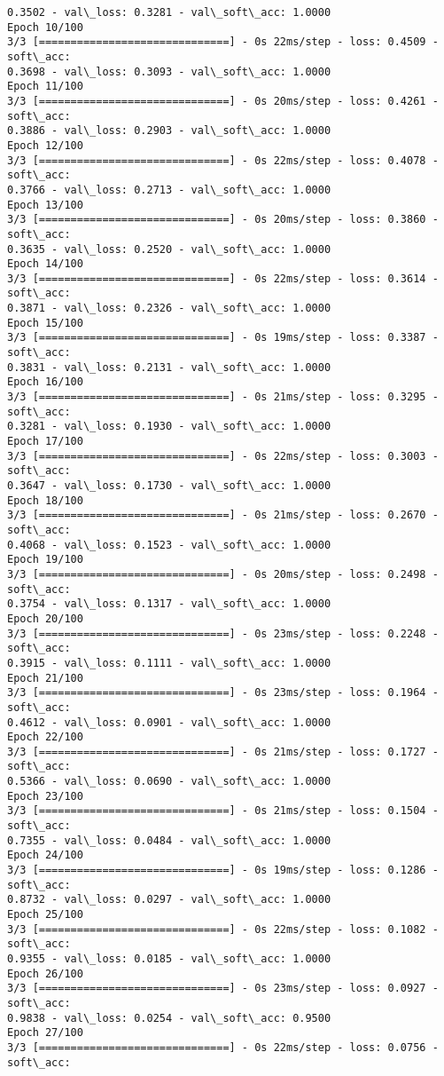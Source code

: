 \documentclass[11pt]{article}
\begin{document}
\begin{Verbatim}[commandchars=\\\{\}]
0.3502 - val\_loss: 0.3281 - val\_soft\_acc: 1.0000
Epoch 10/100
3/3 [==============================] - 0s 22ms/step - loss: 0.4509 - soft\_acc:
0.3698 - val\_loss: 0.3093 - val\_soft\_acc: 1.0000
Epoch 11/100
3/3 [==============================] - 0s 20ms/step - loss: 0.4261 - soft\_acc:
0.3886 - val\_loss: 0.2903 - val\_soft\_acc: 1.0000
Epoch 12/100
3/3 [==============================] - 0s 22ms/step - loss: 0.4078 - soft\_acc:
0.3766 - val\_loss: 0.2713 - val\_soft\_acc: 1.0000
Epoch 13/100
3/3 [==============================] - 0s 20ms/step - loss: 0.3860 - soft\_acc:
0.3635 - val\_loss: 0.2520 - val\_soft\_acc: 1.0000
Epoch 14/100
3/3 [==============================] - 0s 22ms/step - loss: 0.3614 - soft\_acc:
0.3871 - val\_loss: 0.2326 - val\_soft\_acc: 1.0000
Epoch 15/100
3/3 [==============================] - 0s 19ms/step - loss: 0.3387 - soft\_acc:
0.3831 - val\_loss: 0.2131 - val\_soft\_acc: 1.0000
Epoch 16/100
3/3 [==============================] - 0s 21ms/step - loss: 0.3295 - soft\_acc:
0.3281 - val\_loss: 0.1930 - val\_soft\_acc: 1.0000
Epoch 17/100
3/3 [==============================] - 0s 22ms/step - loss: 0.3003 - soft\_acc:
0.3647 - val\_loss: 0.1730 - val\_soft\_acc: 1.0000
Epoch 18/100
3/3 [==============================] - 0s 21ms/step - loss: 0.2670 - soft\_acc:
0.4068 - val\_loss: 0.1523 - val\_soft\_acc: 1.0000
Epoch 19/100
3/3 [==============================] - 0s 20ms/step - loss: 0.2498 - soft\_acc:
0.3754 - val\_loss: 0.1317 - val\_soft\_acc: 1.0000
Epoch 20/100
3/3 [==============================] - 0s 23ms/step - loss: 0.2248 - soft\_acc:
0.3915 - val\_loss: 0.1111 - val\_soft\_acc: 1.0000
Epoch 21/100
3/3 [==============================] - 0s 23ms/step - loss: 0.1964 - soft\_acc:
0.4612 - val\_loss: 0.0901 - val\_soft\_acc: 1.0000
Epoch 22/100
3/3 [==============================] - 0s 21ms/step - loss: 0.1727 - soft\_acc:
0.5366 - val\_loss: 0.0690 - val\_soft\_acc: 1.0000
Epoch 23/100
3/3 [==============================] - 0s 21ms/step - loss: 0.1504 - soft\_acc:
0.7355 - val\_loss: 0.0484 - val\_soft\_acc: 1.0000
Epoch 24/100
3/3 [==============================] - 0s 19ms/step - loss: 0.1286 - soft\_acc:
0.8732 - val\_loss: 0.0297 - val\_soft\_acc: 1.0000
Epoch 25/100
3/3 [==============================] - 0s 22ms/step - loss: 0.1082 - soft\_acc:
0.9355 - val\_loss: 0.0185 - val\_soft\_acc: 1.0000
Epoch 26/100
3/3 [==============================] - 0s 23ms/step - loss: 0.0927 - soft\_acc:
0.9838 - val\_loss: 0.0254 - val\_soft\_acc: 0.9500
Epoch 27/100
3/3 [==============================] - 0s 22ms/step - loss: 0.0756 - soft\_acc:

\end{Verbatim}
\end{document}
